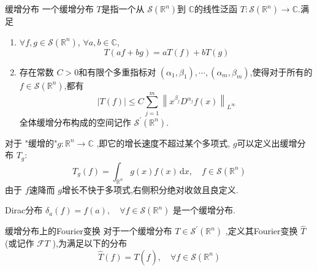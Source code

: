 \documentclass[../../main.tex]{subfiles}
\begin{document}
\begin{definition}{缓增分布}
    一个缓增分布 \(  T  \)是指一个从 \(  \mathcal{S}\left( \mathbb{R} ^{n} \right)   \)到 \(  \mathbb{C}   \)的线性泛函 \(  T:\mathcal{S}\left( \mathbb{R} ^{n} \right)\to \mathbb{C}    \).满足
    \begin{enumerate}
        \item  \(  \forall f,g \in \mathcal{S}\left( \mathbb{R} ^{n} \right)   \), \(  \forall a,b\in \mathbb{C}   \),\[
        T\left( af+ bg \right)= aT\left( f \right)+ bT\left( g \right)   
        \]  
        \item 存在常数 \(  C> 0  \)和有限个多重指标对 \(  \left( \alpha _1 ,\beta _1  \right),\cdots ,\left( \alpha _{m},\beta _{m} \right)    \),使得对于所有的 \(  f\in \mathcal{S}\left( \mathbb{R} ^{n} \right)   \),都有 \[
        \left| T\left( f \right)  \right|\le C\sum _{j= 1}^{m} \left\| x^{\beta _{j}}D^{\alpha _{j}}f\left( x \right)  \right\|_{L^{\infty}} 
        \]   
        全体缓增分布构成的空间记作 \(  \mathcal{S}^{\prime} \left( \mathbb{R} ^{n} \right)   \). 
    \end{enumerate}
        
\end{definition}

\begin{example} [缓增函数诱导的缓增分布]
    对于 "缓增的"\(  g:\mathbb{R} ^{n}\to \mathbb{C}   \) ,即它的增长速度不超过某个多项式, \(  g  \)可以定义出缓增分布 \(  T_{g}:  \) \[
    T_{g}\left( f \right)= \int_{\mathbb{R} ^{n}} g\left( x \right)f\left( x \right)\,\mathrm{d} x,\quad f\in \mathcal{S}\left( \mathbb{R} ^{n} \right)   
    \]
    由于 \(  f  \)速降而 \(  g  \)增长不快于多项式,右侧积分绝对收敛且良定义.    
\end{example}

\begin{example}
    Dirac分布 \(   \delta _{a}\left( f \right)= f\left( a \right),\quad \forall f\in \mathcal{S}\left( \mathbb{R} ^{n} \right)     \) 是一个缓增分布.
\end{example}

\begin{definition}{缓增分布上的Fourier变换}
    对于一个缓增分布 \(  T\in \mathcal{S}^{\prime} \left(\mathbb{R} ^{n} \right)   \) ,定义其Fourier变换 \(  \hat{T}  \)(或记作 \(  \mathcal{F}T  \) ),为满足以下的分布 \[
    \hat{T}\left( f \right)= T\left( \hat{f} \right),\quad \forall f\in \mathcal{S}\left( \mathbb{R} ^{n} \right)   
    \] 
\end{definition}
\end{document}
